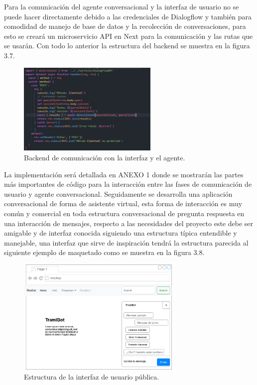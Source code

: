 \documentclass[letter, openright, 12pt]{book}
\begin{document}
\par
Para la comunicación del agente conversacional y la interfaz de usuario no se puede hacer directamente debido a las credenciales de Dialogflow y también para comodidad de manejo de base de datos y la recolección de conversaciones, para esto se creará un microservicio API en Next para la comunicación y las rutas que se usarán. 
Con todo lo anterior la estructura del backend se muestra en la figura 3.7.

\begin{figure}[H]
\centering
\includegraphics[width=0.6\textwidth]{figura3_7}
 \caption{Backend de comunicación con la interfaz y el agente.}
\label{fig:figura3_7}
\end{figure}

La implementación será detallada en ANEXO 1 donde se mostrarán las partes más importantes de código para la interacción entre las fases de comunicación de usuario y agente conversacional. Seguidamente se desarrolla una aplicación conversacional de forma de asistente virtual, esta forma de interacción es muy común y comercial en toda estructura conversacional de pregunta respuesta en una interacción de mensajes, respecto a las necesidades del proyecto este debe ser amigable y de interfaz conocida siguiendo una estructura típica entendible y manejable, una interfaz que sirve de inspiración tendrá la estructura parecida al siguiente ejemplo de maquetado como se muestra en la figura 3.8.

\begin{figure}[H]
\centering
\includegraphics[width=0.7\textwidth]{figura3_8}
 \caption{Estructura de la interfaz de usuario pública.}
\label{fig:figura3_8}
\end{figure}
\end{document}
